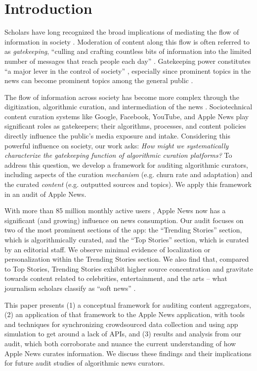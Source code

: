 \section{Introduction}
Scholars have long recognized the broad implications of mediating the flow of information in society \citep{McCombs1972,Entman1993}. Moderation of content along this flow is often referred to as \textit{gatekeeping}, ``culling and crafting countless bits of information into the limited number of messages that reach people each day'' \citep{Shoemaker2009}. Gatekeeping power constitutes ``a major lever in the control of society'' \citep{Bagdikian1983}, especially since prominent topics in the news can become prominent topics among the general public \citep{McCombs2005}. 

The flow of information across society has become more complex through the digitization, algorithmic curation, and intermediation of the news \citep{Diakopoulos2019}. Sociotechnical content curation systems like Google, Facebook, YouTube, and Apple News play significant roles as gatekeepers; their algorithms, processes, and content policies directly influence the public's media exposure and intake. Considering this powerful influence on society, our work asks: \textit{How might we systematically characterize the gatekeeping function of algorithmic curation platforms?} To address this question, we develop a framework for auditing algorithmic curators, including aspects of the curation \textit{mechanism} (e.g. churn rate and adaptation) and the curated \textit{content} (e.g. outputted sources and topics). We apply this framework in an audit of Apple News. 

With more than 85 million monthly active users \citep{Feiner2019}, Apple News now has a significant (and growing) influence on news consumption. Our audit focuses on two of the most prominent sections of the app: the ``Trending Stories'' section, which is algorithmically curated, and the ``Top Stories'' section, which is curated by an editorial staff. We observe minimal evidence of localization or personalization within the Trending Stories section. We also find that, compared to Top Stories, Trending Stories exhibit higher source concentration and gravitate towards content related to celebrities, entertainment, and the arts -- what journalism scholars classify as ``soft news'' \citep{Reinemann2012}.

This paper presents (1) a conceptual framework for auditing content aggregators, (2) an application of that framework to the Apple News application, with tools and techniques for synchronizing crowdsourced data collection and using app simulation to get around a lack of APIs, and (3) results and analysis from our audit, which both corroborate and nuance the current understanding of how Apple News curates information. We discuss these findings and their implications for future audit studies of algorithmic news curators. 

